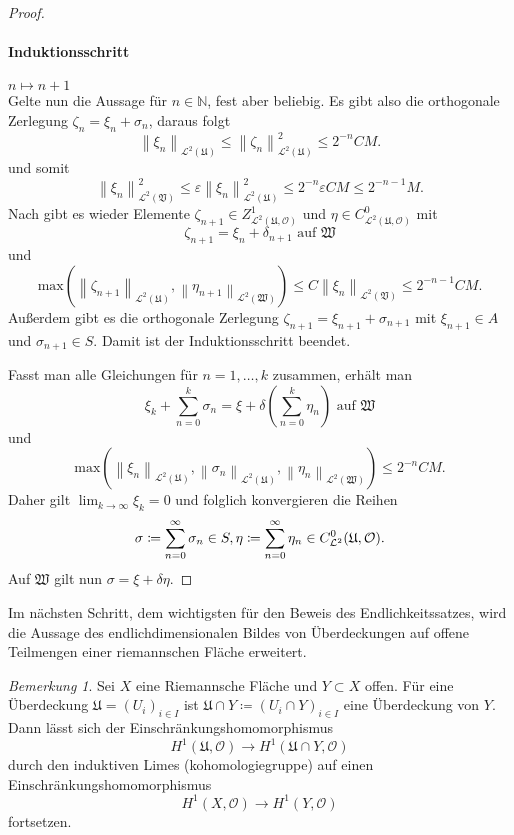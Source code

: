\documentclass[11pt,a4paper,toc=bibliography]{scrartcl}
\theoremstyle{thm}
\theoremstyle{def}
\theoremstyle{remark}
\newtheorem*{bem}{Bemerkung}
\newcommand{\norm}[1]{\left\lVert#1\right\rVert}
\begin{document}
\begin{proof}
\paragraph*{Induktionsschritt} $n\mapsto n+1$\\
Gelte nun die Aussage für $n\in\mathbb{N}$, fest aber beliebig. Es gibt also die orthogonale Zerlegung $\zeta_n=\xi_n+\sigma_n$, daraus folgt
\[
\norm{\xi_n}_{\mathcal{L}^2(\mathfrak{U})}\leq \norm{\zeta_n}_{\mathcal{L}^2(\mathfrak{U})}^2\leq 2^{-n}CM.
\]
und somit
\[
\norm{\xi_n}_{\mathcal{L}^2(\mathfrak{V})}^2\leq \varepsilon \norm{\xi_n}_{\mathcal{L}^2(\mathfrak{U})}^2 \leq 2^{-n}\varepsilon CM\leq
2^{-n-1}M.
\]
Nach  gibt es wieder Elemente $\zeta_{n+1}\in Z^1_{\mathcal{L}^2(\mathfrak{U},\mathcal{O})}$ und $\eta\in C^0_{\mathcal{L}^2(\mathfrak{U},\mathcal{O})}$ mit
\[
\zeta_{n+1}=\xi_n+\delta_{n+1}\text{ auf } \mathfrak{W}
\]
und 
\[
\mathrm{max}(\norm{\zeta_{n+1}}_{\mathcal{L}^2(\mathfrak{U})},\norm{\eta_{n+1}}_{\mathcal{L}^2(\mathfrak{W})})\leq C\norm{\xi_n}_{\mathcal{L}^2(\mathfrak{V})}\leq 2^{-n-1}CM.
\]
Außerdem gibt es die orthogonale Zerlegung $\zeta_{n+1}=\xi_{n+1}+\sigma_{n+1}$ mit $\xi_{n+1}\in A$ und $\sigma_{n+1}\in S$. Damit ist der Induktionsschritt beendet.\par
Fasst man alle Gleichungen für $n=1,\ldots,k$ zusammen, erhält man 
\[
\xi_k+\sum_{n=0}^k \sigma_n = \xi+\delta\left(\sum_{n=0}^k \eta_n\right)\text{ auf } \mathfrak{W}
\]
und
\[
\mathrm{max}(\norm{\xi_n}_{\mathcal{L}^2(\mathfrak{U})},\norm{\sigma_n}_{\mathcal{L}^2(\mathfrak{U})},\norm{\eta_n}_{\mathcal{L}^2(\mathfrak{W})})\leq 2^{-n}CM.
\]
Daher gilt $\lim_{k\rightarrow\infty}\xi_k=0$ und folglich konvergieren die Reihen 
\[
\sigma \coloneqq \sum_{n=0}^{\infty}\sigma_n\in S,\\
\eta \coloneqq \sum_{n=0}^{\infty}\eta_n\in C^0_{\mathcal{L}^2}(\mathfrak{U},\mathcal{O}).
\]
Auf $\mathfrak{W}$ gilt nun $\sigma = \xi +\delta\eta.$
\end{proof}
Im nächsten Schritt, dem wichtigsten für den Beweis des Endlichkeitssatzes, wird die Aussage des endlichdimensionalen Bildes von Überdeckungen auf offene Teilmengen einer riemannschen Fläche erweitert.
\begin{bem}
Sei $X$ eine Riemannsche Fläche und $Y\subset X$ offen. Für eine Überdeckung $\mathfrak{U}=(U_i)_{i\in I}$ ist $\mathfrak{U}\cap Y\coloneqq (U_i\cap Y)_{i\in I}$ eine Überdeckung von $Y$. Dann lässt sich der Einschränkungshomomorphismus 
\[
H^1(\mathfrak{U},\mathcal{O})\rightarrow H^1(\mathfrak{U}\cap Y,\mathcal{O})
\]
durch den induktiven Limes \thref(kohomologiegruppe) auf einen Einschränkungshomomorphismus 
\[
H^1(X,\mathcal{O})\rightarrow H^1(Y,\mathcal{O})
\]
fortsetzen.
\end{bem}
\end{document}

